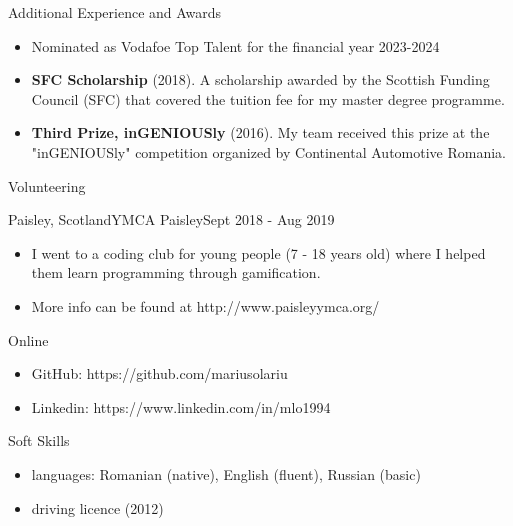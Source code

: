 \documentclass[]{mcdowellcv}
\begin{document}
	\begin{cvsection}{Additional Experience and Awards}
		\begin{cvsubsection}{}{}{}	
			\begin{itemize}
				\item Nominated as Vodafoe Top Talent for the financial year 2023-2024
				\item \textbf{SFC Scholarship} (2018). A scholarship awarded by the Scottish Funding Council (SFC) that covered the tuition fee for my master degree programme.
				\item \textbf{Third Prize, inGENIOUSly} (2016). My team received this prize at the "inGENIOUSly" competition organized by Continental Automotive Romania.
			\end{itemize}
		\end{cvsubsection}
	\end{cvsection}

	\begin{cvsection}{Volunteering}
		\begin{cvsubsection}{Paisley, Scotland}{YMCA Paisley}{Sept 2018 - Aug 2019}
			\begin{itemize}
				\item I went to a coding club for young people (7 - 18 years old) where I helped them learn programming through gamification. 
				\item More info can be found at http://www.paisleyymca.org/
			\end{itemize}
		\end{cvsubsection}
	\end{cvsection}

	\begin{cvsection}{Online}
		\begin{cvsubsection}{}{}{}
			\begin{itemize}
				\item GitHub: https://github.com/mariusolariu
				\item Linkedin: https://www.linkedin.com/in/mlo1994
			\end{itemize}
		\end{cvsubsection}
	\end{cvsection}

	\begin{cvsection}{Soft Skills}
		\begin{cvsubsection}{}{}{}
			\begin{itemize}
				\item languages: Romanian (native), English (fluent), Russian (basic)
				\item driving licence (2012)
			\end{itemize}
		\end{cvsubsection}
	\end{cvsection}
	
\end{document}
